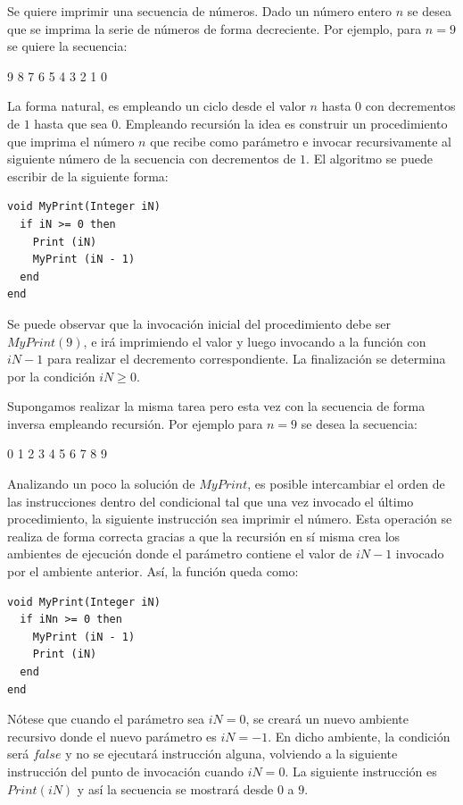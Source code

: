 Se quiere imprimir una secuencia de números. Dado un número entero $n$ se desea que se imprima la serie de números de forma decreciente. Por ejemplo, para $n=9$ se quiere la secuencia:

9 8 7 6 5 4 3 2 1 0

La forma natural, es empleando un ciclo desde el valor $n$ hasta $0$ con decrementos de $1$ hasta que sea $0$. Empleando recursión la idea es construir un procedimiento que imprima el número $n$ que recibe como parámetro e invocar recursivamente al siguiente número de la secuencia con decrementos de $1$. El algoritmo se puede escribir de la siguiente forma:

\begin{lstlisting}[upquote=true, language=pseudo]
void MyPrint(Integer iN)
  if iN >= 0 then
    Print (iN)
    MyPrint (iN - 1)
  end
end
\end{lstlisting}

Se puede observar que la invocación inicial del procedimiento debe ser $MyPrint(9)$, e irá imprimiendo el valor y luego invocando a la función con $iN-1$ para realizar el decremento correspondiente. La finalización se determina por la condición $iN \ge 0$.

Supongamos realizar la misma tarea pero esta vez con la secuencia de forma inversa empleando recursión. Por ejemplo para $n=9$ se desea la secuencia:

0 1 2 3 4 5 6 7 8 9

Analizando un poco la solución de $MyPrint$, es posible intercambiar el orden de las instrucciones dentro del condicional tal que una vez invocado el último procedimiento, la siguiente instrucción sea imprimir el número. Esta operación se realiza de forma correcta gracias a que la recursión en sí misma crea los ambientes de ejecución donde el parámetro contiene el valor de $iN-1$ invocado por el ambiente anterior. Así, la función queda como:

\begin{lstlisting}[upquote=true, language=pseudo]
void MyPrint(Integer iN)
  if iNn >= 0 then
    MyPrint (iN - 1)
    Print (iN)
  end
end
\end{lstlisting}

Nótese que cuando el parámetro sea $iN=0$, se creará un nuevo ambiente recursivo donde el nuevo parámetro es $iN=-1$. En dicho ambiente, la condición será $false$ y no se ejecutará instrucción alguna, volviendo a la siguiente instrucción del punto de invocación cuando $iN=0$. La siguiente instrucción es $Print(iN)$ y así la secuencia se mostrará desde $0$ a $9$.

